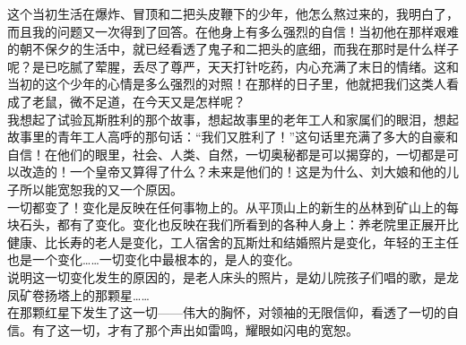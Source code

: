 这个当初生活在爆炸、冒顶和二把头皮鞭下的少年，他怎么熬过来的，我明白了，而且我的问题又一次得到了回答。在他身上有多么强烈的自信！当初他在那样艰难的朝不保夕的生活中，就已经看透了鬼子和二把头的底细，而我在那时是什么样子呢？是已吃腻了荤腥，丢尽了尊严，天天打针吃药，内心充满了末日的情绪。这和当初的这个少年的心情是多么强烈的对照！在那样的日子里，他就把我们这类人看成了老鼠，微不足道，在今天又是怎样呢？\\

我想起了试验瓦斯胜利的那个故事，想起故事里的老年工人和家属们的眼泪，想起故事里的青年工人高呼的那句话：“我们又胜利了！”这句话里充满了多大的自豪和自信！在他们的眼里，社会、人类、自然，一切奥秘都是可以揭穿的，一切都是可以改造的！一个皇帝又算得了什么？未来是他们的！这是为什么、刘大娘和他的儿子所以能宽恕我的又一个原因。\\

一切都变了！变化是反映在任何事物上的。从平顶山上的新生的丛林到矿山上的每块石头，都有了变化。变化也反映在我们所看到的各种人身上：养老院里正展开比健康、比长寿的老人是变化，工人宿舍的瓦斯灶和结婚照片是变化，年轻的王主任也是一个变化……一切变化中最根本的，是人的变化。\\

说明这一切变化发生的原因的，是老人床头的照片，是幼儿院孩子们唱的歌，是龙凤矿卷扬塔上的那颗星……\\

在那颗红星下发生了这一切——伟大的胸怀，对领袖的无限信仰，看透了一切的自信。有了这一切，才有了那个声出如雷鸣，耀眼如闪电的宽恕。
